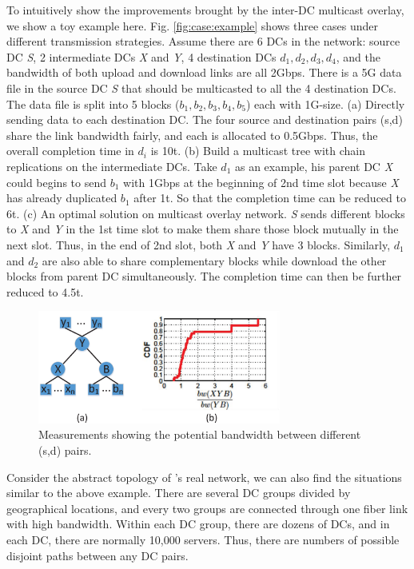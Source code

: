 To intuitively show the improvements brought by the inter-DC multicast overlay, we show a toy example here. Fig. \ref{fig:case:example} shows three cases under different transmission strategies. Assume there are 6 DCs in the network: source DC \emph{S}, 2 intermediate DCs \emph{X} and \emph{Y}, 4 destination DCs $d_1,d_2,d_3,d_4$, and the bandwidth of both upload and download links are all 2Gbps. There is a 5G data file in the source DC \emph{S} that should be multicasted to all the 4 destination DCs. The data file is split into 5 blocks ($b_1,b_2,b_3,b_4,b_5$) each with 1G-size. (a) Directly sending data to each destination DC. The four source and destination pairs (s,d) share the link bandwidth fairly, and each is allocated to 0.5Gbps. Thus, the overall completion time in $d_i$ is 10t. (b) Build a multicast tree with chain replications on the intermediate DCs. Take $d_1$ as an example, his parent DC \emph{X} could begins to send $b_1$ with 1Gbps at the beginning of 2nd time slot because \emph{X} has already duplicated $b_1$ after 1t. So that the completion time can be reduced to 6t. (c) An optimal solution on multicast overlay network. \emph{S} sends different blocks to \emph{X} and \emph{Y} in the 1st time slot to make them share those block mutually in the next slot. Thus, in the end of 2nd slot, both \emph{X} and \emph{Y} have 3 blocks. Similarly, $d_1$ and $d_2$ are also able to share complementary blocks while download the other blocks from parent DC simultaneously. The completion time can then be further reduced to 4.5t.

\begin{figure}[t]
\centering
\includegraphics[width=80mm]{images/potential.eps}
\caption{Measurements showing the potential bandwidth between different (s,d) pairs.}
\label{fig:case:size}
\vspace{-0.4cm}
\end{figure}

Consider the abstract topology of \company's real network, we can also find the situations similar to the above example. There are several DC groups divided by geographical locations, and every two groups are connected through one fiber link with high bandwidth. Within each DC group, there are dozens of DCs, and in each DC, there are normally 10,000 servers. Thus, there are numbers of possible disjoint paths between any DC pairs.

